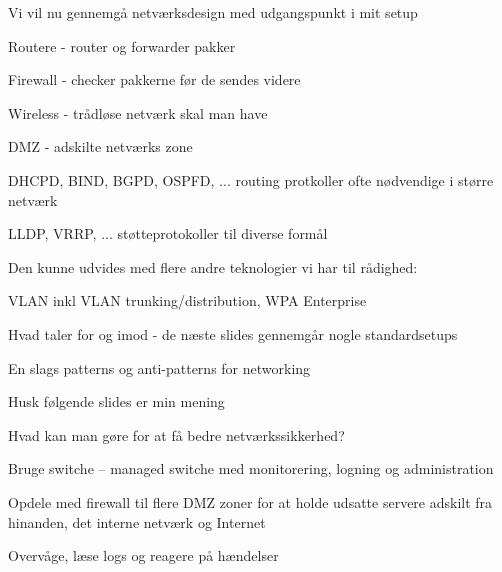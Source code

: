 \documentclass[Screen16to9,17pt]{foils}
\begin{document}
\begin{list1}
\item Vi vil nu gennemgå netværksdesign med udgangspunkt i mit setup
\begin{list2}
\item Routere - router og forwarder pakker
\item Firewall - checker pakkerne før de sendes videre
\item Wireless - trådløse netværk skal man have
\item DMZ - adskilte netværks zone
\item DHCPD, BIND, BGPD, OSPFD, ... routing protkoller ofte nødvendige i større netværk
\item LLDP, VRRP, ... støtteprotokoller til diverse formål
\end{list2}
\item Den kunne udvides med flere andre teknologier vi har til rådighed:
\begin{list2}
\item VLAN inkl VLAN trunking/distribution, WPA Enterprise
\end{list2}
\item Hvad taler for og imod - de næste slides gennemgår nogle standardsetups
\item En slags patterns og
anti-patterns for networking
\item Husk følgende slides er min mening
\end{list1}






\begin{list1}
\item Hvad kan man gøre for at få bedre netværkssikkerhed?
\begin{list2}
\item Bruge switche -- managed switche med monitorering, logning og administration
\item Opdele med firewall til flere DMZ zoner for at holde
      udsatte servere adskilt fra hinanden, det interne netværk og
      Internet
\item Overvåge, læse logs og reagere på hændelser
\end{list2}
\end{list1}


\end{document}

